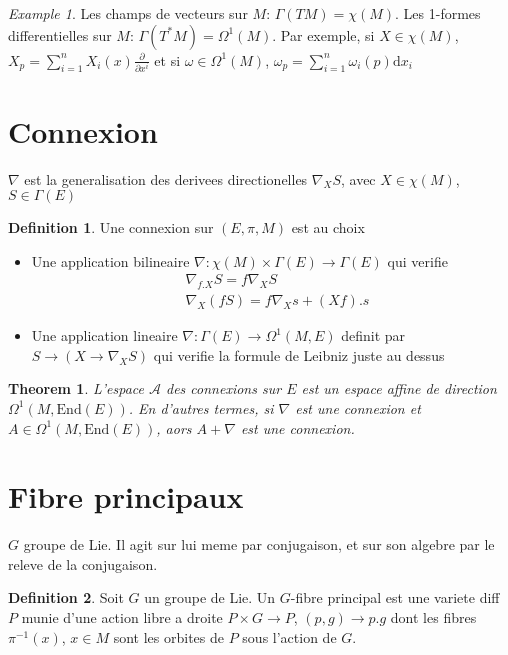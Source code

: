 \documentclass[a4paper]{report}
\newtheorem{theorem}{Theorem}[section]
\theoremstyle{definition}
\newtheorem{definition}{Definition}[section]
\theoremstyle{remark}
\newtheorem*{example}{Example}
\begin{document}
\begin{example}
    Les champs de vecteurs sur $M$: $\Gamma(TM) = \chi(M)$. Les 1-formes differentielles sur $M$: $\Gamma(T^*M) = \Omega^1(M)$. Par exemple, si $X\in \chi(M)$, $X_p = \sum_{i=1}^n X_i(x)\frac{\partial}{\partial x^i}$ et si $\omega \in \Omega^1(M)$, $\omega_p = \sum_{i=1}^n \omega_i(p) \text{d}x_i$
\end{example}

\section{Connexion}

$\nabla$ est la generalisation des derivees directionelles $\nabla_X S$, avec $X \in \chi(M)$, $S \in \Gamma(E)$

\begin{definition}
    Une connexion sur $(E, \pi, M)$ est au choix 
    \begin{itemize}
        \item Une application bilineaire $\nabla: \chi(M) \times \Gamma(E) \rightarrow \Gamma(E)$ qui verifie 
        \begin{equation}
            \begin{aligned}
                &\nabla_{f.X}S = f\nabla_X S \\ 
                &\nabla_X (fS) = f\nabla_X s + (Xf).s 
            \end{aligned}
        \end{equation}
        \item Une application lineaire $\nabla : \Gamma(E) \rightarrow \Omega^1(M,E)$ definit par $S\rightarrow (X \rightarrow \nabla_X S)$ qui verifie la formule de Leibniz juste au dessus  
    \end{itemize}
\end{definition}
\begin{theorem}
    L'espace $\mathcal A$ des connexions sur $E$ est un espace affine de direction $\Omega^1 (M, \text{End}(E))$. En d'autres termes, si $\nabla$ est une connexion et $A \in \Omega^1 (M, \text{End}(E))$, aors $A + \nabla$ est une connexion.
\end{theorem}

\section{Fibre principaux} 
$G$ groupe de Lie. Il agit sur lui meme par conjugaison, et sur son algebre par le releve de la conjugaison. 
\begin{definition}
    Soit $G$ un groupe de Lie. Un $G$-fibre principal est une variete diff $P$ munie d'une action libre a droite $P\times G \rightarrow P$, $(p,g) \rightarrow p.g$ dont les fibres $\pi^{-1}(x)$, $x\in M$ sont les orbites de $P$ sous l'action de $G$. 
\end{definition}
\end{document}
